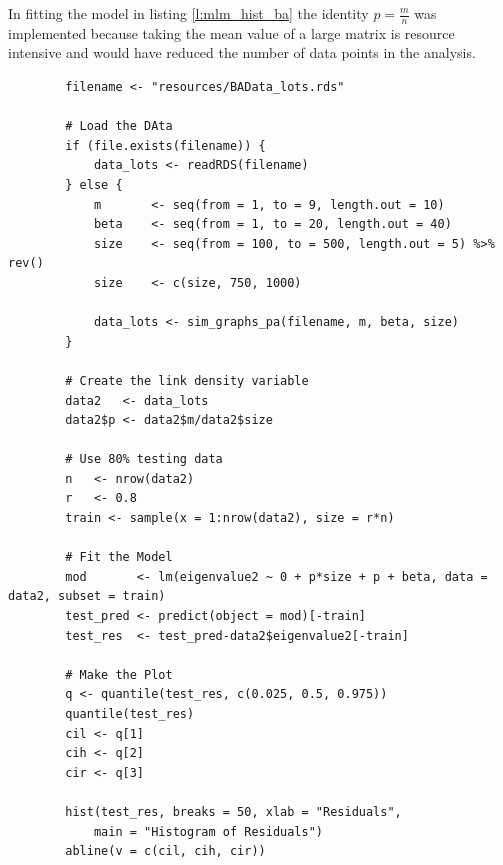 \documentclass[11pt]{report}
\begin{document}
In fitting the model in listing \ref{l:mlm_hist_ba} the identity \(p = \frac{m}{n}\) was implemented because taking the mean value of a large matrix is resource intensive and would have reduced the number of data points in the analysis.


\begin{listing}[htbp]
    \begin{tcolorbox}
        \begin{verbatim}
        filename <- "resources/BAData_lots.rds"

        # Load the DAta
        if (file.exists(filename)) {
            data_lots <- readRDS(filename)
        } else {
            m       <- seq(from = 1, to = 9, length.out = 10)
            beta    <- seq(from = 1, to = 20, length.out = 40)
            size    <- seq(from = 100, to = 500, length.out = 5) %>% rev()
            size    <- c(size, 750, 1000)

            data_lots <- sim_graphs_pa(filename, m, beta, size)
        }

        # Create the link density variable
        data2   <- data_lots
        data2$p <- data2$m/data2$size

        # Use 80% testing data
        n   <- nrow(data2)
        r   <- 0.8
        train <- sample(x = 1:nrow(data2), size = r*n)

        # Fit the Model
        mod       <- lm(eigenvalue2 ~ 0 + p*size + p + beta, data = data2, subset = train)
        test_pred <- predict(object = mod)[-train]
        test_res  <- test_pred-data2$eigenvalue2[-train]

        # Make the Plot
        q <- quantile(test_res, c(0.025, 0.5, 0.975))
        quantile(test_res)
        cil <- q[1]
        cih <- q[2]
        cir <- q[3]

        hist(test_res, breaks = 50, xlab = "Residuals",
            main = "Histogram of Residuals")
        abline(v = c(cil, cih, cir))

        \end{verbatim}
    \end{tcolorbox}
\caption{\label{l:mlm_hist_ba}l:mlm\textsubscript{hist}\textsubscript{ba}}
\end{listing}
\end{document}
